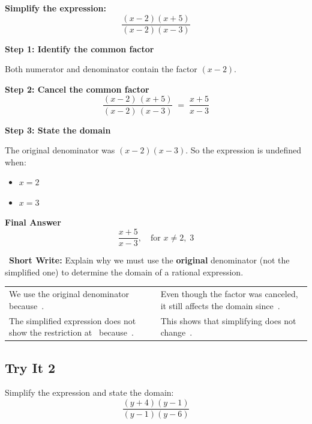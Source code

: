 \documentclass[11pt]{article}
\newcommand{\blk}[1][1.2cm]{\underline{\hspace{#1}}}
\newcommand{\shortwrite}[1]{%
  \vspace{3pt}%
  \noindent\ding{97}~\textbf{Short Write:} #1\par%
}
\begin{document}
\noindent\textbf{Simplify the expression:}
\[
  \frac{(x-2)(x+5)}{(x-2)(x-3)}
\]

\noindent\textbf{Step 1:\; Identify the common factor}\par
Both numerator and denominator contain the factor $(x-2)$.

\noindent\textbf{Step 2:\; Cancel the common factor}
\[
  \frac{\boxed{(x-2)}\,(x+5)}{\boxed{(x-2)}\,(x-3)} \;=\; \frac{x+5}{x-3}
\]

\noindent\textbf{Step 3:\; State the domain}\par
The original denominator was $(x-2)(x-3)$.  So the expression is undefined when:
\begin{itemize}[leftmargin=1.5em,itemsep=1pt,topsep=2pt]
  \item $x = 2$
  \item $x = 3$
\end{itemize}

\noindent\textbf{Final Answer}
\[
  \frac{x+5}{x-3},\quad \text{for } x\neq 2,\;3
\]

\shortwrite{Explain why we must use the \textbf{original} denominator
(not the simplified one) to determine the domain of a rational expression.}

\begin{workspace}[3]\end{workspace}

\vspace{4pt}
\begin{frames}
\begin{tabularx}{\linewidth}{XX}
  We use the original denominator because \blk[2.5cm]\,.\; &
  Even though the factor was canceled, it still affects the domain since \blk[2.5cm]\,.\; \\
  \vspace{4pt}\par
  The simplified expression does not show the restriction at \blk\ because \blk[2.5cm]\,.\; &
  \vspace{4pt}\par
  This shows that simplifying does not change \blk[2.5cm]\,.\; \\
\end{tabularx}
\end{frames}

\subsection*{Try It 2}
\noindent Simplify the expression and state the domain:
\[
  \frac{(y+4)(y-1)}{(y-1)(y-6)}
\]
\end{document}
